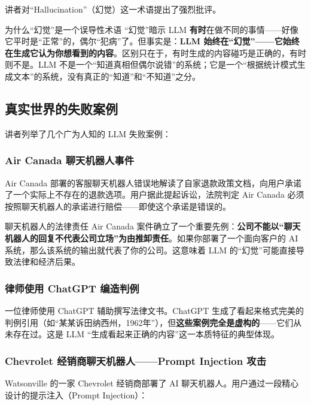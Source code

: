 \documentclass[a4paper]{article}
\begin{document}
讲者对``Hallucination''（幻觉）这一术语提出了强烈批评。

\begin{importantbox}{为什么``幻觉''是一个误导性术语}
``幻觉''暗示 LLM \textbf{有时}在做不同的事情——好像它平时是``正常''的，偶尔``犯病''了。但事实是：\textbf{LLM 始终在``幻觉''——它始终在生成它认为你想看到的内容}。区别只在于，有时生成的内容碰巧是正确的，有时则不是。LLM 不是一个``知道真相但偶尔说错''的系统；它是一个``根据统计模式生成文本''的系统，没有真正的``知道''和``不知道''之分。
\end{importantbox}

\subsection{真实世界的失败案例}

讲者列举了几个广为人知的 LLM 失败案例：

\subsubsection{Air Canada 聊天机器人事件}

Air Canada 部署的客服聊天机器人错误地解读了自家退款政策文档，向用户承诺了一个实际上不存在的退款选项。用户据此提起诉讼，法院判定 Air Canada 必须按照聊天机器人的承诺进行赔偿——即使这个承诺是错误的。

\begin{warningbox}{聊天机器人的法律责任}
Air Canada 案件确立了一个重要先例：\textbf{公司不能以``聊天机器人的回复不代表公司立场''为由推卸责任}。如果你部署了一个面向客户的 AI 系统，那么该系统的输出就代表了你的公司。这意味着 LLM 的``幻觉''可能直接导致法律和经济后果。
\end{warningbox}

\subsubsection{律师使用 ChatGPT 编造判例}

一位律师使用 ChatGPT 辅助撰写法律文书。ChatGPT 生成了看起来格式完美的判例引用（如``某某诉田纳西州，1962年''），但\textbf{这些案例完全是虚构的}——它们从未存在过。这是 LLM ``生成看起来正确的内容''这一本质特征的典型体现。

\subsubsection{Chevrolet 经销商聊天机器人——Prompt Injection 攻击}

Watsonville 的一家 Chevrolet 经销商部署了 AI 聊天机器人。用户通过一段精心设计的提示注入（Prompt Injection）：
\end{document}
